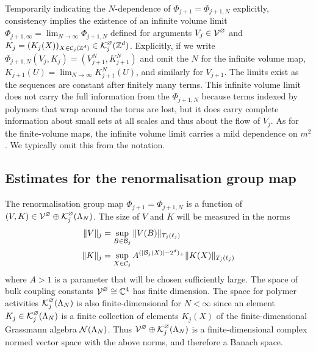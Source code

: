 \documentclass[11pt]{amsart}
\numberwithin{equation}{section}
\numberwithin{theorem}{section}
\newcommand{\1}{{\bf 1}}
\newcommand{\cVbulk}{\cV^\varnothing}
\newcommand{\cKbulk}{\cK^\varnothing}
\begin{document}
Temporarily indicating the $N$-dependence of $\Phi_{j+1}=\Phi_{j+1,N}$
explicitly, consistency implies the existence of an infinite volume
limit $\Phi_{j+1,\infty}=\lim_{N\to\infty} \Phi_{j+1,N}$ defined for
arguments $V_j \in \cVbulk$ and
$K_j =(K_j(X))_{X\in\cC_j(\Z^d)} \in \cKbulk_{j}(\Z^{d})$.
Explicitly, if we write
$\Phi_{j+1,N}(V_{j},K_{j})= (V^{N}_{j+1},K^{N}_{j+1})$ and omit the
$N$ for the infinite volume map,
$K_{j+1}(U) = \lim_{N\to\infty} K^{N}_{j+1}(U)$, and similarly for
$V_{j+1}$. The limits exist as the sequences are constant after
finitely many terms.  This infinite volume limit does not carry the
full information from the $\Phi_{j+1,N}$ because terms indexed by
polymers that wrap around the torus are lost, but it does carry
complete information about small sets at all scales and thus about the
flow of $V_j$. As for the finite-volume maps, the infinite
volume limit carries a mild dependence on $m^{2}$. We typically omit this
from the notation.


\subsection{Estimates for the renormalisation group map}
\label{sec:step}

The renormalisation group map $\Phi_{j+1}= \Phi_{j+1,N}$ is a function
of $(V,K)\in\cVbulk \oplus \cKbulk_j(\Lambda_N)$.
The size of $V$ and $K$ will be measured in the norms
\begin{align}
  \label{e:V-norm}
  \|V\|_j &= \sup_{B\in \mathcal B_j} \|V(B)\|_{T_j(\ell_j)}
  \\
  \label{e:K-norm}
  \|K\|_j &= \sup_{X\in \mathcal C_j} A^{(|\mathcal{B}_j(X)|-2^d)_+} \|K(X)\|_{T_j(\ell_j)}
\end{align}
where $A>1$ is a parameter that will be chosen sufficiently large.
The space of bulk coupling constants $\cVbulk \cong \C^4$ has
finite dimension.  The space for polymer activities
$\cKbulk_j(\Lambda_N)$ is also finite-dimensional for $N<\infty$
since an element $K_j \in \cKbulk_j(\Lambda_N)$ is a finite
collection of elements $K_j(X)$ of the finite-dimensional Grassmann
algebra $\mathcal N(\Lambda_N)$.  Thus
$\cVbulk \oplus \cKbulk_j(\Lambda_N)$ is a finite-dimensional complex
normed vector space with the above norms, and therefore a Banach space.
\end{document}
